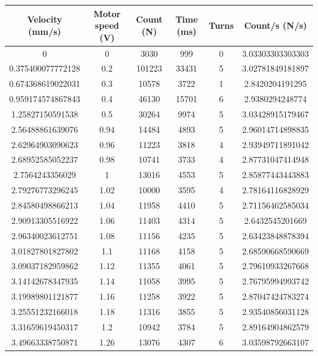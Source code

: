 \documentclass[a4paper]{report}
\numberwithin{equation}{section}
\begin{document}
\begin{table}[!ht]
    \centering
    \begin{tabular}{|c|c|c|c|c|c|}
    \hline
        Velocity (mm/s) & Motor speed (V) & Count (N) & Time (ms) & Turns & Count/s (N/s) \\ \hline
        0 & 0 & 3030 & 999 & 0 & 3.03303303303303 \\ \hline
        0.375400077772128 & 0.2 & 101223 & 33431 & 5 & 3.02781849181897 \\ \hline
        0.674368619022031 & 0.3 & 10578 & 3722 & 1 & 2.8420204191295 \\ \hline
        0.959174574867843 & 0.4 & 46130 & 15701 & 6 & 2.9380294248774 \\ \hline
        1.25827150591538 & 0.5 & 30264 & 9974 & 5 & 3.03428915179467 \\ \hline
        2.56488861639076 & 0.94 & 14484 & 4893 & 5 & 2.96014714898835 \\ \hline
        2.62964903090623 & 0.96 & 11223 & 3818 & 4 & 2.93949711891042 \\ \hline
        2.68952585052237 & 0.98 & 10741 & 3733 & 4 & 2.87731047414948 \\ \hline
        2.7564243356029 & 1 & 13016 & 4553 & 5 & 2.85877443443883 \\ \hline
        2.79276773296245 & 1.02 & 10000 & 3595 & 4 & 2.78164116828929 \\ \hline
        2.84580498866213 & 1.04 & 11958 & 4410 & 5 & 2.71156462585034 \\ \hline
        2.90913305516922 & 1.06 & 11403 & 4314 & 5 & 2.6432545201669 \\ \hline
        2.96340023612751 & 1.08 & 11156 & 4235 & 5 & 2.63423848878394 \\ \hline
        3.01827801827802 & 1.1 & 11168 & 4158 & 5 & 2.68590668590669 \\ \hline
        3.09037182959862 & 1.12 & 11355 & 4061 & 5 & 2.79610933267668 \\ \hline
        3.14142678347935 & 1.14 & 11058 & 3995 & 5 & 2.76795994993742 \\ \hline
        3.19989801121877 & 1.16 & 11258 & 3922 & 5 & 2.87047424783274 \\ \hline
        3.25551232166018 & 1.18 & 11316 & 3855 & 5 & 2.93540856031128 \\ \hline
        3.31659619450317 & 1.2 & 10942 & 3784 & 5 & 2.89164904862579 \\ \hline
        3.49663338750871 & 1.26 & 13076 & 4307 & 6 & 3.03598792663107 \\ \hline

\end{tabular}
\end{table}
\end{document}
